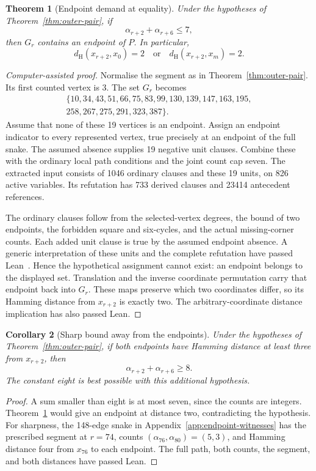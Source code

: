 \documentclass[11pt,a4paper]{article}
\newtheorem{theorem}{Theorem}[section]
\newtheorem{corollary}[theorem]{Corollary}
\theoremstyle{definition}
\theoremstyle{remark}
\newcommand{\Ham}{d_{\mathrm H}}
\begin{document}
\begin{theorem}[Endpoint demand at equality]\label{thm:endpoint-demand}
Under the hypotheses of Theorem~\ref{thm:outer-pair}, if
\[
\alpha_{r+2}+\alpha_{r+6}\le7,
\]
then $G_r$ contains an endpoint of $P$. In particular,
\[
\Ham(x_{r+2},x_0)=2\quad\text{or}\quad
\Ham(x_{r+2},x_m)=2.
\]
\end{theorem}
\begin{proof}[Computer-assisted proof]
Normalise the segment as in Theorem~\ref{thm:outer-pair}. Its first counted vertex is 3. The set $G_r$ becomes
\[
\begin{gathered}
\{10,34,43,51,66,75,83,99,130,139,147,163,195,\\
258,267,275,291,323,387\}.
\end{gathered}
\]
Assume that none of these 19 vertices is an endpoint. Assign an endpoint indicator to every represented vertex, true precisely at an endpoint of the full snake. The assumed absence supplies 19 negative unit clauses. Combine these with the ordinary local path conditions and the joint count cap seven. The extracted input consists of 1046 ordinary clauses and these 19 units, on 826 active variables. Its refutation has 733 derived clauses and 23414 antecedent references.

The ordinary clauses follow from the selected-vertex degrees, the bound of two endpoints, the forbidden square and six-cycles, and the actual missing-corner counts. Each added unit clause is true by the assumed endpoint absence. A generic interpretation of these units and the complete refutation have passed Lean~\cite{endpointarchive}. Hence the hypothetical assignment cannot exist: an endpoint belongs to the displayed set. Translation and the inverse coordinate permutation carry that endpoint back into $G_r$. These maps preserve which two coordinates differ, so its Hamming distance from $x_{r+2}$ is exactly two. The arbitrary-coordinate distance implication has also passed Lean.
\end{proof}

\begin{corollary}[Sharp bound away from the endpoints]\label{cor:endpoint-free-pair}
Under the hypotheses of Theorem~\ref{thm:outer-pair}, if both endpoints have Hamming distance at least three from $x_{r+2}$, then
\[
\alpha_{r+2}+\alpha_{r+6}\ge8.
\]
The constant eight is best possible with this additional hypothesis.
\end{corollary}
\begin{proof}
A sum smaller than eight is at most seven, since the counts are integers. Theorem~\ref{thm:endpoint-demand} would give an endpoint at distance two, contradicting the hypothesis. For sharpness, the 148-edge snake in Appendix~\ref{app:endpoint-witnesses} has the prescribed segment at $r=74$, counts $(\alpha_{76},\alpha_{80})=(5,3)$, and Hamming distance four from $x_{76}$ to each endpoint. The full path, both counts, the segment, and both distances have passed Lean.
\end{proof}
\end{document}
